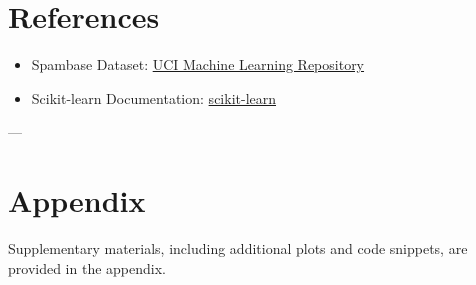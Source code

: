 \documentclass[12pt]{article}
\begin{document}
\section{References}
\begin{itemize}
    \item Spambase Dataset: \href{https://archive.ics.uci.edu/ml/datasets/Spambase}{UCI Machine Learning Repository}
    \item Scikit-learn Documentation: \href{https://scikit-learn.org/}{scikit-learn}
\end{itemize}

---

\appendix
\section{Appendix}
Supplementary materials, including additional plots and code snippets, are provided in the appendix.
\end{document}
